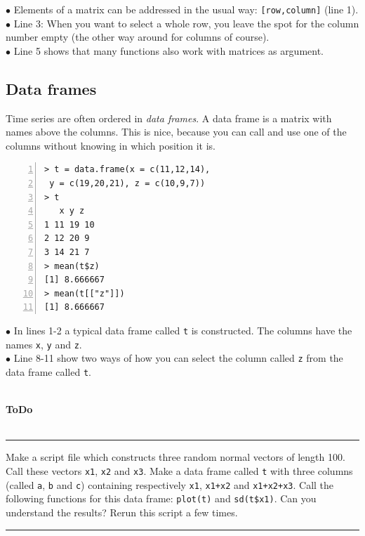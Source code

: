 \documentclass[a4paper,11pt,twocolumn,tablecaptionabove]{scrartcl} %
\newenvironment{ToDo} {%
  \begin{flushright}
    \hfill
    \begin{minipage}{0.95\columnwidth}         %
    \textsf{\textbf{ToDo}} \\
      \vspace{-0.85cm}\\
      {\color{Gray}\rule[-0.1cm]{\columnwidth}{1.5pt}}} { %
      {\color{Gray} \rule[0.3cm]{\columnwidth}{1.5pt}}
    \end{minipage}
    \vspace{1em}
  \end{flushright}
  }
\begin{document}
\noindent $\bullet$ Elements of a matrix can be addressed in the usual way: \texttt{[row,column]} (line 1). \\
\noindent $\bullet$ Line 3: When you want to select a whole row, you leave the spot for the column number empty (the other way around for columns of course).\\
\noindent $\bullet$ Line 5 shows that many functions also work with matrices as argument.\\

\subsection{Data frames}

Time series are often ordered in \emph{data frames}. A data frame is a matrix with names above the columns. This is nice, because you can call and use one of the columns without knowing in which position it is.
\begin{Verbatim}[frame=single,numbers=left,gobble=0, xleftmargin=0.35cm, numbersep=0.1cm]
> t = data.frame(x = c(11,12,14),
 y = c(19,20,21), z = c(10,9,7))
> t
   x y z
1 11 19 10
2 12 20 9 
3 14 21 7  
> mean(t$z)
[1] 8.666667
> mean(t[["z"]])
[1] 8.666667
\end{Verbatim}

\noindent $\bullet$ In lines 1-2 a typical data frame called \texttt{t} is constructed. The columns have the names \texttt{x}, \texttt{y} and \texttt{z}.\\
\noindent $\bullet$ Line 8-11 show two ways of how you can select the column called \texttt{z} from the data frame called \texttt{t}.\\
\\

\begin{ToDo}
Make a script file which constructs three random normal vectors of length 100. Call these vectors \texttt{x1}, \texttt{x2} and \texttt{x3}. Make a data frame called \texttt{t} with three columns (called \texttt{a}, \texttt{b} and \texttt{c}) containing respectively \texttt{x1}, \texttt{x1+x2} and \texttt{x1+x2+x3}. Call the following functions for this data frame: \texttt{plot(t)} and \texttt{sd(t\$x1)}. Can you understand the results? Rerun this script a few times.\\
\end{ToDo}

\end{document}
